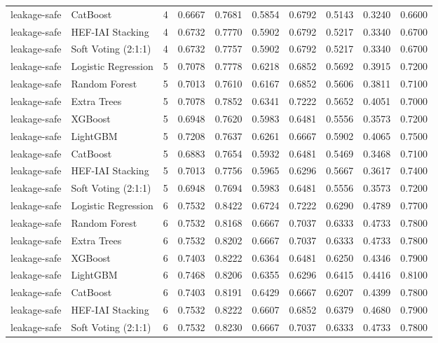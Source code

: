 \begin{tabular}{llrrrrrrrr}
leakage-safe & CatBoost & 4 & 0.6667 & 0.7681 & 0.5854 & 0.6792 & 0.5143 & 0.3240 & 0.6600 \\
leakage-safe & HEF-IAI Stacking & 4 & 0.6732 & 0.7770 & 0.5902 & 0.6792 & 0.5217 & 0.3340 & 0.6700 \\
leakage-safe & Soft Voting (2:1:1) & 4 & 0.6732 & 0.7757 & 0.5902 & 0.6792 & 0.5217 & 0.3340 & 0.6700 \\
leakage-safe & Logistic Regression & 5 & 0.7078 & 0.7778 & 0.6218 & 0.6852 & 0.5692 & 0.3915 & 0.7200 \\
leakage-safe & Random Forest & 5 & 0.7013 & 0.7610 & 0.6167 & 0.6852 & 0.5606 & 0.3811 & 0.7100 \\
leakage-safe & Extra Trees & 5 & 0.7078 & 0.7852 & 0.6341 & 0.7222 & 0.5652 & 0.4051 & 0.7000 \\
leakage-safe & XGBoost & 5 & 0.6948 & 0.7620 & 0.5983 & 0.6481 & 0.5556 & 0.3573 & 0.7200 \\
leakage-safe & LightGBM & 5 & 0.7208 & 0.7637 & 0.6261 & 0.6667 & 0.5902 & 0.4065 & 0.7500 \\
leakage-safe & CatBoost & 5 & 0.6883 & 0.7654 & 0.5932 & 0.6481 & 0.5469 & 0.3468 & 0.7100 \\
leakage-safe & HEF-IAI Stacking & 5 & 0.7013 & 0.7756 & 0.5965 & 0.6296 & 0.5667 & 0.3617 & 0.7400 \\
leakage-safe & Soft Voting (2:1:1) & 5 & 0.6948 & 0.7694 & 0.5983 & 0.6481 & 0.5556 & 0.3573 & 0.7200 \\
leakage-safe & Logistic Regression & 6 & 0.7532 & 0.8422 & 0.6724 & 0.7222 & 0.6290 & 0.4789 & 0.7700 \\
leakage-safe & Random Forest & 6 & 0.7532 & 0.8168 & 0.6667 & 0.7037 & 0.6333 & 0.4733 & 0.7800 \\
leakage-safe & Extra Trees & 6 & 0.7532 & 0.8202 & 0.6667 & 0.7037 & 0.6333 & 0.4733 & 0.7800 \\
leakage-safe & XGBoost & 6 & 0.7403 & 0.8222 & 0.6364 & 0.6481 & 0.6250 & 0.4346 & 0.7900 \\
leakage-safe & LightGBM & 6 & 0.7468 & 0.8206 & 0.6355 & 0.6296 & 0.6415 & 0.4416 & 0.8100 \\
leakage-safe & CatBoost & 6 & 0.7403 & 0.8191 & 0.6429 & 0.6667 & 0.6207 & 0.4399 & 0.7800 \\
leakage-safe & HEF-IAI Stacking & 6 & 0.7532 & 0.8222 & 0.6607 & 0.6852 & 0.6379 & 0.4680 & 0.7900 \\
leakage-safe & Soft Voting (2:1:1) & 6 & 0.7532 & 0.8230 & 0.6667 & 0.7037 & 0.6333 & 0.4733 & 0.7800 \\

\end{tabular}
